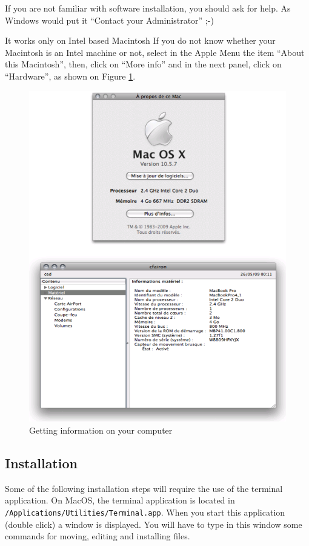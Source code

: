\bigskip
\noindent If you are not familiar with software installation, you should ask for
help. As Windows would put it ``Contact your Administrator'' ;-) 

\bigskip
\noindent It works only on Intel based Macintosh If you do not know whether your 
Macintosh is an Intel machine or not, select in the Apple Menu the item 
``About this Macintosh'', then, click on ``More info'' and in the next panel,
click on ``Hardware'', as shown on Figure \ref{fig-mac1}.

\begin{figure}[!h]
\begin{center}
\includegraphics[width=13cm]{resources/img/fig-mac1.png}
\caption{Getting information on your computer\label{fig-mac1}}
\end{center}
\end{figure}

\clearpage

\subsection{Installation}
\noindent Some of the following installation steps will require the use of the
terminal application. On MacOS, the terminal application is located in 
\verb+/Applications/Utilities/Terminal.app+.  When you start this application
(double click) a window is displayed. You will have to type in this window 
some commands for moving, editing and installing files.

